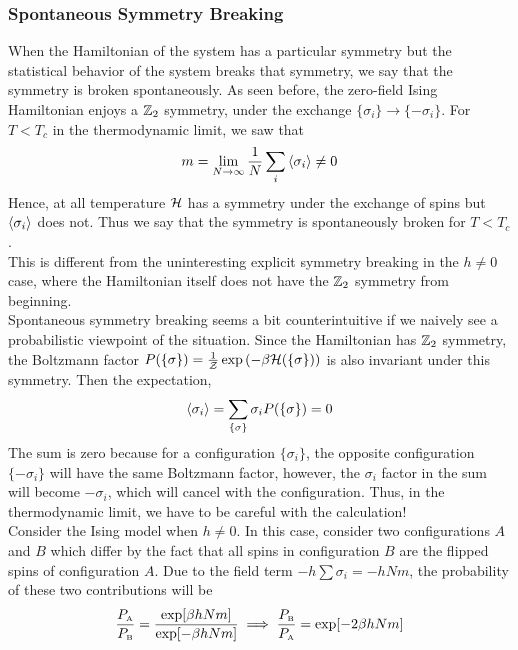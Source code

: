 \subsubsection{Spontaneous Symmetry Breaking}
When the Hamiltonian of the system has a particular symmetry but the statistical behavior of the system breaks that symmetry, we say that the symmetry is broken spontaneously. As seen before, the zero-field Ising Hamiltonian enjoys a $\mathbb{Z}_2$ symmetry, under the exchange $\{\sigma_i \}\to \{-\sigma_i\}$. For $T<T_c$ in the thermodynamic limit, we saw that 
$$m = \lim\limits_{N\to \infty} \frac{1}{N}\sum\limits_i \left\langle \sigma_i \right\rangle \neq 0$$
Hence, at all temperature $\mathcal H$ has a symmetry under the exchange of spins but $\left\langle \sigma_i \right\rangle$ does not. Thus we say that the symmetry is spontaneously broken for $T<T_c$.\\[0.2cm]
This is different from the uninteresting explicit symmetry breaking in the $h\neq 0$ case, where the Hamiltonian itself does not have the $\mathbb{Z}_2$ symmetry from beginning.\\[0.2cm]
Spontaneous symmetry breaking seems a bit counterintuitive if we naively see a probabilistic viewpoint of the situation. Since the Hamiltonian has $\mathbb{Z}_2$ symmetry, the Boltzmann factor $P(\{\sigma\}) = \frac{1}{\mathcal Z}\exp\qty(-\beta \mathcal H(\{\sigma\}))$ is also invariant under this symmetry. Then the expectation, 
\begin{align*}
    \left\langle \sigma_i \right\rangle = \sum\limits_{\{\sigma\}}\sigma_i P(\{\sigma\}) = 0 
\end{align*}
The sum is zero because for a configuration $\{\sigma_i\}$, the opposite configuration $\{-\sigma_i\}$ will have the same Boltzmann factor, however, the $\sigma_i$ factor in the sum will become $-\sigma_i$, which will cancel with the configuration. Thus, in the thermodynamic limit, we have to be careful with the calculation!\\[0.2cm]
Consider the Ising model when $h\neq 0$. In this case, consider two configurations $A$ and $B$ which differ by the fact that all spins in configuration $B$ are the flipped spins of configuration $A$. Due to the field term $-h\sum \sigma_i = -hNm$, the probability of these two contributions will be
$$\frac{P_{\text{\tiny A}}}{P_{\text{\tiny B}}} = \frac{\exp[\beta h N m ]}{\exp[-\beta h N m ]} \implies \frac{P_{\text{\tiny B}}}{P_{\text{\tiny A}}} = \exp[-2\beta h N m ]$$
